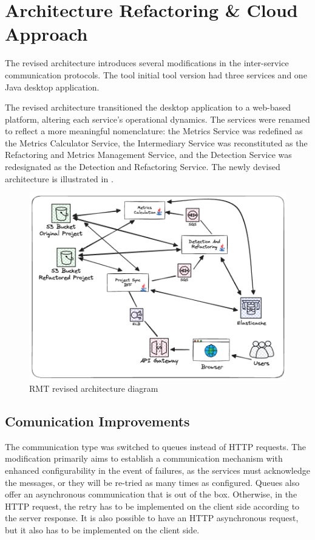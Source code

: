 \section{Architecture Refactoring \& Cloud Approach}
\label{sec-cloud}
The revised architecture introduces several modifications in the inter-service communication protocols. The tool initial tool version had three services and one Java desktop application. 

The revised architecture transitioned the desktop application to a web-based platform, altering each service's operational dynamics. The services were renamed to reflect a more meaningful nomenclature: the Metrics Service was redefined as the Metrics Calculator Service, the Intermediary Service was reconstituted as the Refactoring and Metrics Management Service, and the Detection Service was redesignated as the Detection and Refactoring Service. The newly devised architecture is illustrated in .

\begin{figure}[ht!]
\SetCaptionWidth{\textwidth}
\caption{RMT revised architecture diagram}
\label{fig-async}
\includegraphics[width =\textwidth, scale=0.2]{Chapter-5/Figures/Async.png}
\end{figure}
\FloatBarrier

\subsection{Comunication Improvements}

The communication type was switched to queues instead of HTTP requests. The modification primarily aims to establish a communication mechanism with enhanced configurability in the event of failures, as the services must acknowledge the messages, or they will be re-tried as many times as configured. Queues also offer an asynchronous communication that is out of the box. Otherwise, in the HTTP request, the retry has to be implemented on the client side according to the server response. It is also possible to have an HTTP asynchronous request, but it also has to be implemented on the client side.

